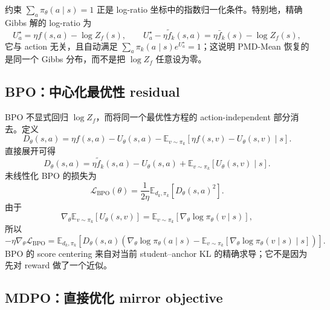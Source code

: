 约束 $\sum_a\pi_\theta(a\mid s)=1$ 正是 log-ratio 坐标中的指数归一化条件。特别地，精确 Gibbs 解的 log-ratio 为
\[
U_a^\star=\eta f(s,a)-\log Z_f(s),\qquad
U_a^\star-\eta\widetilde f_k(s,a)=\eta\bar f_k(s)-\log Z_f(s),
\]
它与 action 无关，且自动满足 $\sum_a\pi_k(a\mid s)e^{U_a^\star}=1$；这说明 PMD-Mean 恢复的是同一个 Gibbs 分布，而不是把 $\log Z_f$ 任意设为零。


\subsection{BPO：中心化最优性 residual}
\label{sec:ch2-bpo}

BPO 不显式回归 $\log Z_f$，而将同一个最优性方程的 action-independent 部分消去。定义
\begin{equation}
\label{eq:ch2-bpo-residual}
D_\theta(s,a)
=\eta f(s,a)-U_\theta(s,a)
-\mathbb E_{v\sim\pi_k}[\eta f(s,v)-U_\theta(s,v)\mid s].
\end{equation}
直接展开可得
\[
D_\theta(s,a)
=\eta\widetilde f_k(s,a)-U_\theta(s,a)
+\mathbb E_{v\sim\pi_k}[U_\theta(s,v)\mid s].
\]
未线性化 BPO 的损失为
\begin{equation}
\label{eq:ch2-bpo-loss}
\mathcal L_{\mathrm{BPO}}(\theta)
=\frac1{2\eta}\mathbb E_{d_k,\pi_k}[D_\theta(s,a)^2].
\end{equation}
由于
\[
\nabla_\theta\mathbb E_{v\sim\pi_k}[U_\theta(s,v)]
=\mathbb E_{v\sim\pi_k}[\nabla_\theta\log\pi_\theta(v\mid s)],
\]
所以
\begin{equation}
\label{eq:ch2-bpo-gradient}
-\eta\nabla_\theta\mathcal L_{\mathrm{BPO}}
=\mathbb E_{d_k,\pi_k}\left[D_\theta(s,a)
\left(\nabla_\theta\log\pi_\theta(a\mid s)
-\mathbb E_{v\sim\pi_k}[\nabla_\theta\log\pi_\theta(v\mid s)\mid s]\right)\right].
\end{equation}
BPO 的 score centering 来自对当前 student--anchor KL 的精确求导；它不是因为先对 reward 做了一个近似。

\subsection{MDPO：直接优化 mirror objective}
\label{sec:ch2-mdpo-generic}

